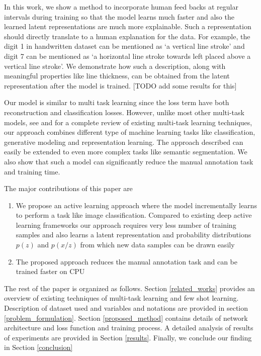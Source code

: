 \documentclass{uai2021} %
\begin{document}
In this work, we show a method to incorporate human feed backs at regular intervals during training so that the model learns much faster and also the learned latent representations are much more explainable.
Such a representation should directly translate to a human explanation for the data.
For example, the digit 1 in  handwritten dataset  can be mentioned as  `a vertical line stroke'  and digit 7 can be mentioned as `a horizontal line stroke towards left placed  above a vertical line stroke'.
We demonstrate how  such a description, along with meaningful properties like line thickness, can be obtained from the latent representation after the model is trained. [TODO add some results for this]


Our model is similar to multi task learning since the loss term have both reconstruction and classification losses.
However, unlike most other multi-task models, see \cite{ruder2017overview} and \cite{crawshaw2020multi} for a complete review of existing multi-task learning techniques, our approach combines  different type of machine learning tasks like classification, generative modeling and representation learning.
The approach described can easily be extended to even more complex tasks like semantic segmentation.
We also show that such a model can significantly reduce the manual annotation task and training time.

The major contributions of this paper are
\begin{enumerate}
    \item We propose an active learning approach where the model incrementally learns to perform a task like image classification.
          Compared to existing deep active learning frameworks our approach requires very less number of training samples and also learns a latent representation and  probability distributions $p(z)$ and $p(x/z)$ from which new data samples can be drawn easily
    \item The proposed approach reduces the manual annotation task and can be trained faster on CPU
\end{enumerate}

The rest of the paper is organized as follows.
Section \ref{related_works} provides an overview of existing techniques of multi-task learning and few shot learning.
Description of dataset used and variables and notations are provided in section \ref{problem_formulation}.
Section \ref{proposed_method} contains details of network architecture and loss function and training process.
A detailed analysis of results of experiments are provided in Section \ref{results}.
Finally, we conclude our finding in Section \ref{conclusion}
\end{document}
